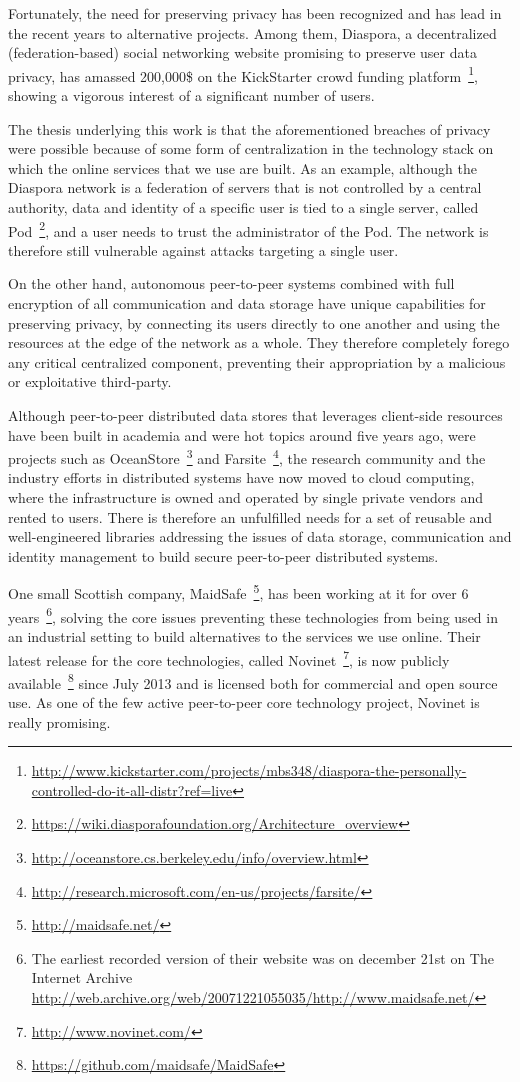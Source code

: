Fortunately, the need for preserving privacy has been recognized and has lead in the recent years to alternative projects. Among them, Diaspora, a decentralized (federation-based) social networking website promising to preserve user data privacy, has amassed 200,000\$ on the KickStarter crowd funding platform~\footnote{\url{http://www.kickstarter.com/projects/mbs348/diaspora-the-personally-controlled-do-it-all-distr?ref=live}}, showing a vigorous interest of a significant number of users. 

The thesis underlying this work is that the aforementioned breaches of privacy were possible because of some form of centralization in the technology stack on which the online services that we use are built. As an example, although the Diaspora network is a federation of servers that is not controlled by a central authority, data and identity of a specific user is tied to a single server, called Pod~\footnote{\url{https://wiki.diasporafoundation.org/Architecture_overview}}, and a user needs to trust the administrator of the Pod. The network is therefore still vulnerable against attacks targeting a single user.

On the other hand, autonomous peer-to-peer systems combined with full encryption of all communication and data storage have unique capabilities for preserving privacy, by connecting its users directly to one another and using the resources at the edge of the network as a whole. They therefore completely forego any critical centralized component, preventing their appropriation by a malicious or exploitative third-party.

Although peer-to-peer distributed data stores that leverages client-side resources have been built in academia and were hot topics around five years ago, were projects such as OceanStore~\footnote{\url{http://oceanstore.cs.berkeley.edu/info/overview.html}} and Farsite~\footnote{\url{http://research.microsoft.com/en-us/projects/farsite/}}, the research community and the industry efforts in distributed systems have now moved to cloud computing, where the infrastructure is owned and operated by single private vendors and rented to users. There is therefore an unfulfilled needs for a set of reusable and well-engineered libraries addressing the issues of data storage, communication and identity management to build secure peer-to-peer distributed systems.

One small Scottish company, MaidSafe~\footnote{\url{http://maidsafe.net/}}, has been working at it for over 6 years~\footnote{The earliest recorded version of their website was on december 21st on The Internet Archive \url{http://web.archive.org/web/20071221055035/http://www.maidsafe.net/}}, solving the core issues preventing these technologies from being used in an industrial setting to build alternatives to the services we use online. Their latest release for the core technologies, called Novinet~\footnote{\url{http://www.novinet.com/}}, is now publicly available~\footnote{\url{https://github.com/maidsafe/MaidSafe}} since July 2013 and is licensed both for commercial and open source use. As one of the few active peer-to-peer core technology project, Novinet is really promising.

